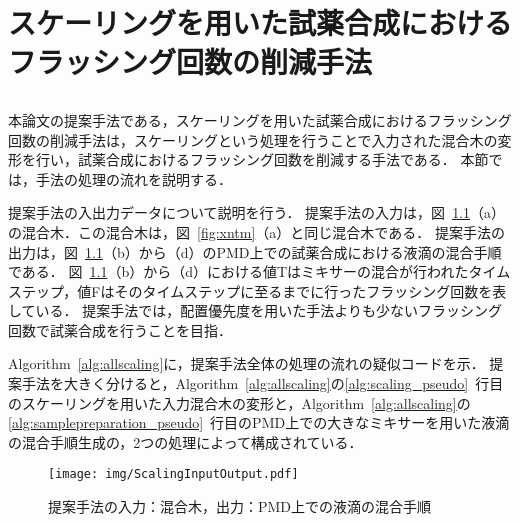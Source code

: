 \chapter{スケーリングを用いた試薬合成におけるフラッシング回数の削減手法}
\section{}
本論文の提案手法である，スケーリングを用いた試薬合成におけるフラッシング回数の削減手法は，スケーリングという処理を行うことで入力された混合木の変形を行い，試薬合成におけるフラッシング回数を削減する手法である．
本節では，手法の処理の流れを説明する．

提案手法の入出力データについて説明を行う．
提案手法の入力は，図~\ref{fig:ScalingInputOutput}（a）の混合木．この混合木は，図~\ref{fig:xntm}（a）と同じ混合木である．
提案手法の出力は，図~\ref{fig:ScalingInputOutput}（b）から（d）のPMD上での試薬合成における液滴の混合手順である．
図~\ref{fig:ScalingInputOutput}（b）から（d）における値Tはミキサーの混合が行われたタイムステップ，値Fはそのタイムステップに至るまでに行ったフラッシング回数を表している．
提案手法では，配置優先度を用いた手法よりも少ないフラッシング回数で試薬合成を行うことを目指．

Algorithm~\ref{alg:allscaling}に，提案手法全体の処理の流れの疑似コードを示．
提案手法を大きく分けると，Algorithm~\ref{alg:allscaling}の\ref{alg:scaling_pseudo}~行目のスケーリングを用いた入力混合木の変形と，Algorithm~\ref{alg:allscaling}の\ref{alg:samplepreparation_pseudo}~行目のPMD上での大きなミキサーを用いた液滴の混合手順生成の，2つの処理によって構成されている．

\begin{figure}[tbp]
 \centering 
    \begin{center}
    \texttt{[image: img/ScalingInputOutput.pdf]}
    \end{center}
 \caption{提案手法の入力：混合木，出力：PMD上での液滴の混合手順}\label{fig:ScalingInputOutput}
\end{figure}

